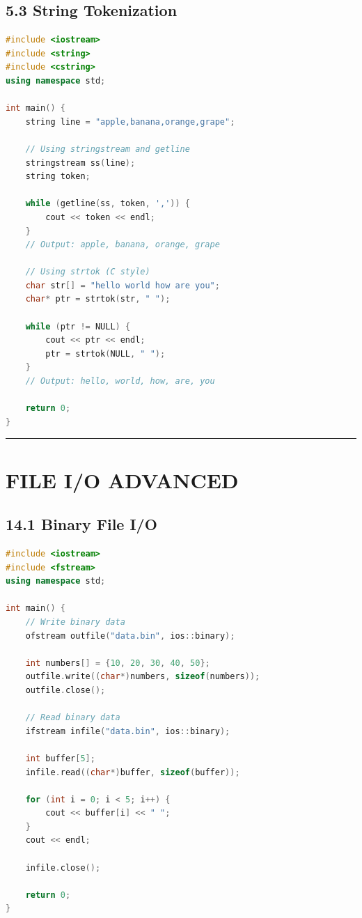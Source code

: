 \hypertarget{string-tokenization}{%
\section{5.3 String Tokenization}\label{string-tokenization}}

\begin{lstlisting}[language={C++}]
#include <iostream>
#include <string>
#include <cstring>
using namespace std;

int main() {
    string line = "apple,banana,orange,grape";
    
    // Using stringstream and getline
    stringstream ss(line);
    string token;
    
    while (getline(ss, token, ',')) {
        cout << token << endl;
    }
    // Output: apple, banana, orange, grape
    
    // Using strtok (C style)
    char str[] = "hello world how are you";
    char* ptr = strtok(str, " ");
    
    while (ptr != NULL) {
        cout << ptr << endl;
        ptr = strtok(NULL, " ");
    }
    // Output: hello, world, how, are, you
    
    return 0;
}
\end{lstlisting}

\begin{center}\rule{0.5\linewidth}{0.5pt}\end{center}

\hypertarget{file-io-advanced}{%
\chapter{FILE I/O ADVANCED}\label{file-io-advanced}}

\hypertarget{binary-file-io}{%
\section{14.1 Binary File I/O}\label{binary-file-io}}

\begin{lstlisting}[language={C++}]
#include <iostream>
#include <fstream>
using namespace std;

int main() {
    // Write binary data
    ofstream outfile("data.bin", ios::binary);
    
    int numbers[] = {10, 20, 30, 40, 50};
    outfile.write((char*)numbers, sizeof(numbers));
    outfile.close();
    
    // Read binary data
    ifstream infile("data.bin", ios::binary);
    
    int buffer[5];
    infile.read((char*)buffer, sizeof(buffer));
    
    for (int i = 0; i < 5; i++) {
        cout << buffer[i] << " ";
    }
    cout << endl;
    
    infile.close();
    
    return 0;
}
\end{lstlisting}


